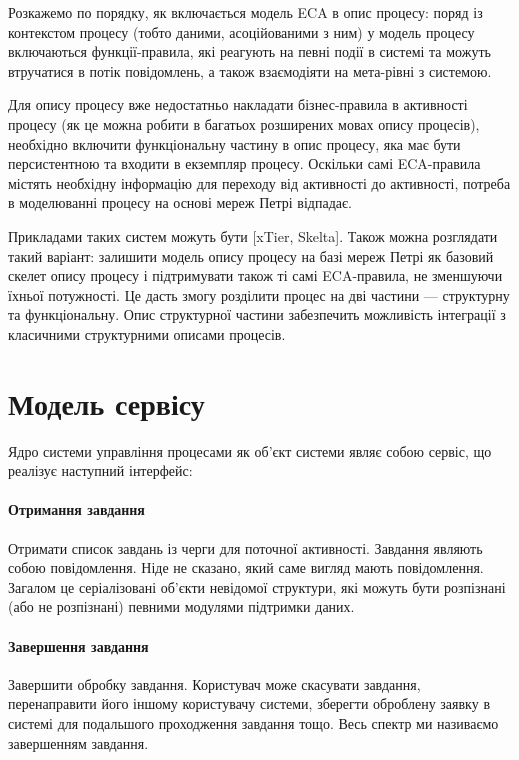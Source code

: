 \documentclass{memoir}
\begin{document}
Розкажемо по порядку, як включається модель ECA в опис процесу: поряд із контекстом процесу (тобто даними, асоційованими з ним) у модель процесу включаються функції-правила, які реагують на певні події в системі та можуть втручатися в потік повідомлень, а також взаємодіяти на мета-рівні з системою.

Для опису процесу вже недостатньо накладати бізнес-правила в активності процесу (як це можна робити в багатьох розширених мовах опису процесів), необхідно включити функціональну частину в опис процесу, яка має бути персистентною та входити в екземпляр процесу. Оскільки самі ECA-правила містять необхідну інформацію для переходу від активності до активності, потреба в моделюванні процесу на основі мереж Петрі відпадає.

Прикладами таких систем можуть бути [xTier, Skelta]. Також можна розглядати такий варіант: залишити модель опису процесу на базі мереж Петрі як базовий скелет опису процесу і підтримувати також ті самі ECA-правила, не зменшуючи їхньої потужності. Це дасть змогу розділити процес на дві частини — структурну та функціональну. Опис структурної частини забезпечить можливість інтеграції з класичними структурними описами процесів.

\section{Модель сервісу}

Ядро системи управління процесами як об’єкт системи являє собою сервіс, що реалізує наступний інтерфейс:

\paragraph{Отримання завдання}

Отримати список завдань із черги для поточної активності. Завдання являють собою повідомлення. Ніде не сказано, який саме вигляд мають повідомлення. Загалом це серіалізовані об’єкти невідомої структури, які можуть бути розпізнані (або не розпізнані) певними модулями підтримки даних.

\paragraph{Завершення завдання}

Завершити обробку завдання. Користувач може скасувати завдання, перенаправити його іншому користувачу системи, зберегти оброблену заявку в системі для подальшого проходження завдання тощо. Весь спектр ми називаємо завершенням завдання.
\end{document}
